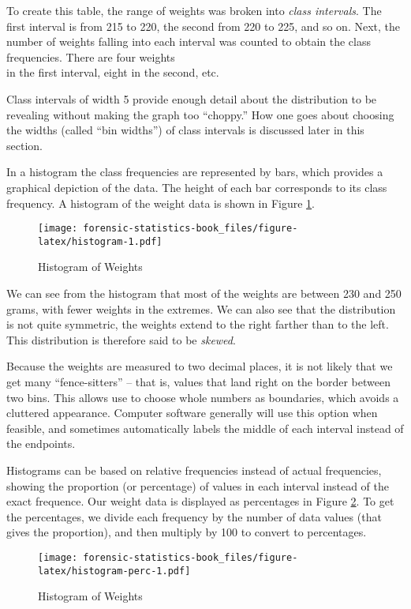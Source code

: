 \documentclass[
]{book}
\begin{document}
To create this table, the range of weights was broken into \emph{class intervals}.
The first interval is from 215 to 220, the second from 220 to 225, and so on. Next, the number of weights
falling into each interval was counted to obtain the class frequencies. There are four weights\\
in the first interval, eight in the second, etc.

Class intervals of width 5 provide enough detail about the distribution to be revealing without
making the graph too ``choppy.'' How one goes about choosing the widths (called ``bin widths'') of
class intervals is discussed later in this section.

In a histogram the class frequencies are represented by bars, which provides a graphical
depiction of the data. The height of each bar corresponds
to its class frequency. A histogram of the weight data is shown in Figure \ref{fig:histogram}.

\begin{figure}
\centering
\texttt{[image: forensic-statistics-book\_files/figure-latex/histogram-1.pdf]}
\caption{\label{fig:histogram}Histogram of Weights}
\end{figure}

We can see from the histogram that most of the weights are between 230 and 250 grams,
with fewer weights in the extremes. We can also see that the distribution is not
quite symmetric, the weights extend to the right farther than to the left. This
distribution is therefore said to be \emph{skewed}.

Because the weights are measured to two decimal
places, it is not likely that we get many ``fence-sitters'' -- that is, values
that land right on the border between two bins. This allows use to choose
whole numbers as boundaries, which avoids a cluttered appearance. Computer
software generally will use this option when feasible, and sometimes automatically
labels the middle of each interval instead of the endpoints.

Histograms can be based on relative frequencies instead of actual frequencies,
showing the proportion (or percentage) of values in each interval instead of
the exact frequence. Our weight data is displayed as percentages in
Figure \ref{fig:histogram-perc}. To get the percentages, we divide
each frequency by the number of data values (that gives the proportion), and
then multiply by 100 to convert to percentages.

\begin{figure}
\centering
\texttt{[image: forensic-statistics-book\_files/figure-latex/histogram-perc-1.pdf]}
\caption{\label{fig:histogram-perc}Histogram of Weights}
\end{figure}
\end{document}

